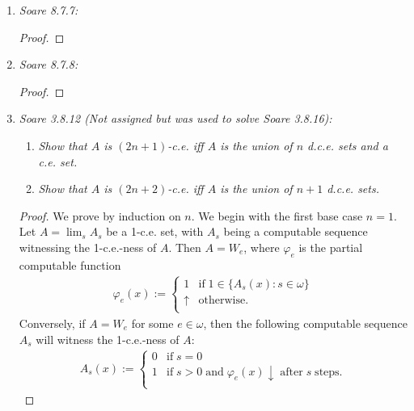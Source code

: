\documentclass{article}
\begin{document}
\begin{enumerate}[label={\bf Q\arabic*:}]
  \item \it Soare 8.7.7:
    \begin{proof}
    \end{proof}

  \item \it Soare 8.7.8:
    \begin{proof}
    \end{proof}

  \item \label{q:ce} \it Soare 3.8.12 (Not assigned but was used to solve
    Soare 3.8.16):
    \begin{enumerate}[label={(\roman*)}]
      \item \it Show that $A$ is $(2n+1)$-c.e. iff $A$ is the union of $n$
        d.c.e. sets and a c.e. set.
      \item \it Show that $A$ is $(2n+2)$-c.e. iff $A$ is the union of $n+1$
        d.c.e. sets.
    \end{enumerate}

    \begin{proof}
      We prove by induction on $n$. We begin with the first base case
      $n=1$. Let $A=\lim_s A_s$ be a 1-c.e. set, with $A_s$ being a
      computable sequence witnessing the 1-c.e.-ness of $A$. Then $A=W_e$,
      where $\varphi_e$ is the partial computable function
      \begin{align*}
        \varphi_e(x) :=
        \begin{cases}
          1 &\text{if}\; 1\in\{A_s(x):s\in\omega\}\\
          \uparrow &\text{otherwise}.\\
        \end{cases}
      \end{align*}
      Conversely, if $A=W_e$ for some $e\in\omega$, then the following
      computable sequence $A_s$ will witness the 1-c.e.-ness of $A$:
      \begin{align*}
        A_s(x) :=
        \begin{cases}
          0 &\text{if}\; s=0\\
          1 &\text{if}\; s>0\; \text{and}\; \varphi_e(x)\downarrow\;
          \text{after}\; s\; \text{steps}.\\
        \end{cases}
      \end{align*}


\end{proof}
\end{enumerate}
\end{document}

